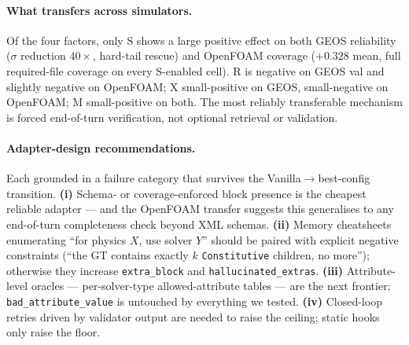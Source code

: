 \documentclass{article}
\begin{document}
\paragraph{What transfers across simulators.} Of the four factors, only $\mathrm{S}$ shows a large positive effect on both GEOS reliability ($\sigma$ reduction $40\times$, hard-tail rescue) and OpenFOAM coverage ($+0.328$ mean, full required-file coverage on every S-enabled cell). $\mathrm{R}$ is negative on GEOS val and slightly negative on OpenFOAM; $\mathrm{X}$ small-positive on GEOS, small-negative on OpenFOAM; $\mathrm{M}$ small-positive on both. The most reliably transferable mechanism is forced end-of-turn verification, not optional retrieval or validation.

\paragraph{Adapter-design recommendations.} Each grounded in a failure category that survives the Vanilla$\to$best-config transition. \textbf{(i)} Schema- or coverage-enforced block presence is the cheapest reliable adapter --- and the OpenFOAM transfer suggests this generalises to any end-of-turn completeness check beyond XML schemas. \textbf{(ii)} Memory cheatsheets enumerating ``for physics $X$, use solver $Y$'' should be paired with explicit negative constraints (``the GT contains exactly $k$ \texttt{Constitutive} children, no more''); otherwise they increase \texttt{extra\_block} and \texttt{hallucinated\_extras}. \textbf{(iii)} Attribute-level oracles --- per-solver-type allowed-attribute tables --- are the next frontier; \texttt{bad\_attribute\_value} is untouched by everything we tested. \textbf{(iv)} Closed-loop retries driven by validator output are needed to raise the ceiling; static hooks only raise the floor.
\end{document}
